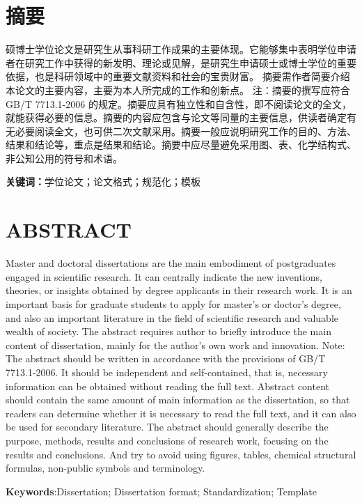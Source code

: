 \section*{摘\hspace{\ccwd}要}

硕博士学位论文是研究生从事科研工作成果的主要体现。它能够集中表明学位申请者在研究工作中获得的新发明、理论或见解，是研究生申请硕士或博士学位的重要依据，也是科研领域中的重要文献资料和社会的宝贵财富。
摘要需作者简要介绍本论文的主要内容，主要为本人所完成的工作和创新点。
注：摘要的撰写应符合GB/T 7713.1-2006 的规定。摘要应具有独立性和自含性，即不阅读论文的全文，就能获得必要的信息。摘要的内容应包含与论文等同量的主要信息，供读者确定有无必要阅读全文，也可供二次文献采用。摘要一般应说明研究工作的目的、方法、结果和结论等，重点是结果和结论。摘要中应尽量避免采用图、表、化学结构式、非公知公用的符号和术语。


\vspace{12bp}
\noindent\textbf{关键词：}学位论文；论文格式；规范化；模板

\pagebreak
\section*{ABSTRACT}

Master and doctoral dissertations are the main embodiment of postgraduates engaged in scientific research. It can centrally indicate the new inventions, theories, or insights obtained by degree applicants in their research work. It is an important basis for graduate students to apply for master's or doctor's degree, and also an important literature in the field of scientific research and valuable wealth of society.
The abstract requires author to briefly introduce the main content of dissertation, mainly for the author’s own work and innovation.  
Note: The abstract should be written in accordance with the provisions of GB/T 7713.1-2006. It should be independent and self-contained, that is, necessary information can be obtained without reading the full text. Abstract content should contain the same amount of main information as the dissertation, so that readers can determine whether it is necessary to read the full text, and it can also be used for secondary literature. The abstract should generally describe the purpose, methods, results and conclusions of research work, focusing on the results and conclusions. And try to avoid using figures, tables, chemical structural formulas, non-public symbols and terminology.


\vspace{12bp}
\noindent\textbf{Keywords}:\enskip Dissertation; Dissertation format; Standardization; Template
